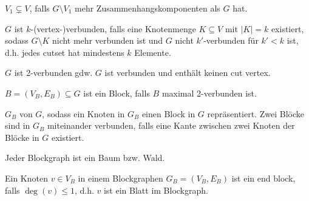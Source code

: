 \begin{definition}[Cutset]
    $ V_1 \subsetneq V $, falls $ G \setminus V_1 $ mehr Zusammenhangskomponenten als $ G $ hat.
\end{definition}

\begin{definition}
    $ G $ ist $ k $-(vertex-)verbunden, falls eine Knotenmenge $ K \subseteq V $ mit $ |K| = k $ existiert, sodass $ G \setminus K $ nicht mehr verbunden ist und $ G $ nicht $ k' $-verbunden für $ k' < k $ ist, d.h. jedes cutset hat mindestens $ k $ Elemente.
\end{definition}

\begin{proposition}
    $ G $ ist 2-verbunden gdw. $ G $ ist verbunden und enthält keinen cut vertex.
\end{proposition}

\begin{definition}[Block]
    $ B = (V_B, E_B) \subseteq G $ ist ein Block, falls $ B $ maximal 2-verbunden ist.
\end{definition}

\begin{definition}[Blockgraph]
    $ G_B $ von $ G $, sodass ein Knoten in $ G_B $ einen Block in $ G $ repräsentiert.
    Zwei Blöcke sind in $ G_B $ miteinander verbunden, falls eine Kante zwischen zwei Knoten der Blöcke in $ G $ existiert.
\end{definition}

\begin{proposition}
    Jeder Blockgraph ist ein Baum bzw. Wald.
\end{proposition}

\begin{definition}
    Ein Knoten $ v \in V_B $ in einem Blockgraphen $ G_B = (V_B, E_B) $ ist ein end block, falls $ \deg(v) \leq 1 $, d.h. $ v $ ist ein Blatt im Blockgraph.
\end{definition}
